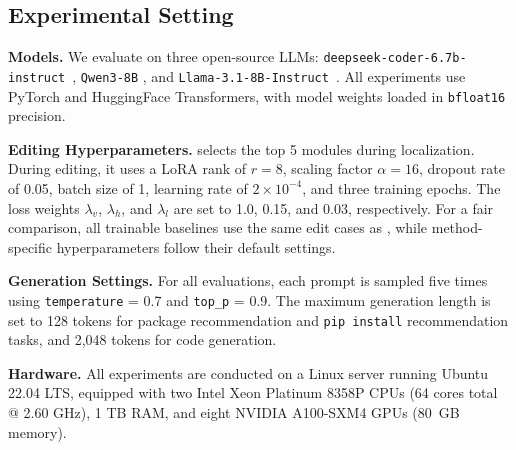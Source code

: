 \subsection{Experimental Setting}

\noindent\textbf{Models.}
We evaluate on three open-source LLMs: \texttt{deepseek-coder-6.7b-instruct}~\cite{guo2024deepseek}, \texttt{Qwen3-8B}
\cite{yang2025qwen3}, and \texttt{Llama-3.1-8B-Instruct}~\cite{grattafiori2024llama}. All experiments use PyTorch and HuggingFace Transformers, with model weights loaded in \texttt{bfloat16} precision.

\noindent\textbf{Editing Hyperparameters.}
\appname selects the top 5 modules during localization. 
During editing, it uses a LoRA rank of $r=8$, scaling factor $\alpha=16$, dropout rate of 0.05, batch size of 1, learning rate of $2\times10^{-4}$, and three training epochs. The loss weights $\lambda_v$, $\lambda_h$, and $\lambda_l$ are set to 1.0, 0.15, and 0.03, respectively. For a fair comparison, all trainable baselines use the same edit cases as \appname, while method-specific hyperparameters follow their default settings.


\noindent\textbf{Generation Settings.}
For all evaluations, each prompt is sampled five times using \texttt{temperature} = 0.7 and \texttt{top\_p} = 0.9. The maximum generation length is set to 128 tokens for package recommendation and \texttt{pip install} recommendation tasks, and 2,048 tokens for code generation.


\noindent\textbf{Hardware.}
All experiments are conducted on a Linux server running Ubuntu 22.04 LTS, equipped with two Intel Xeon Platinum 8358P CPUs (64 cores total @ 2.60 GHz), 1 TB RAM, and eight NVIDIA A100-SXM4 GPUs (80~GB memory).
